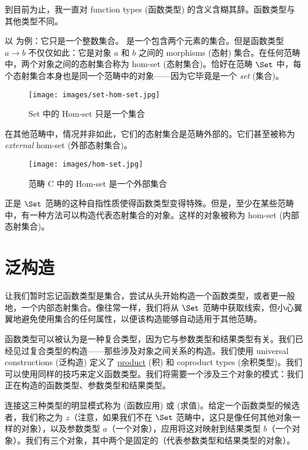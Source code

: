 
\lettrine[lhang=0.17]{到}{目前为止}，我一直对 function types (函数类型) 的含义含糊其辞。函数类型与其他类型不同。

以  为例：它只是一个整数集合。 是一个包含两个元素的集合。但是函数类型 $a\to b$ 不仅仅如此：它是对象 $a$ 和 $b$ 之间的 morphisms (态射) 集合。在任何范畴中，两个对象之间的态射集合称为 hom-set (态射集合)。恰好在范畴 $\Set$ 中，每个态射集合本身也是同一个范畴中的对象——因为它毕竟是一个 \emph{set} (集合)。

\begin{figure}[H]
  \centering
  \texttt{[image: images/set-hom-set.jpg]}
  \caption{Set 中的 Hom-set 只是一个集合}
\end{figure}

\noindent
在其他范畴中，情况并非如此，它们的态射集合是范畴外部的。它们甚至被称为 \emph{external} hom-set (外部态射集合)。

\begin{figure}[H]
  \centering
  \texttt{[image: images/hom-set.jpg]}
  \caption{范畴 C 中的 Hom-set 是一个外部集合}
\end{figure}

\noindent
正是 $\Set$ 范畴的这种自指性质使得函数类型变得特殊。但是，至少在某些范畴中，有一种方法可以构造代表态射集合的对象。这样的对象被称为  hom-set (内部态射集合)。

\section{泛构造}

让我们暂时忘记函数类型是集合，尝试从头开始构造一个函数类型，或者更一般地，一个内部态射集合。像往常一样，我们将从 $\Set$ 范畴中获取线索，但小心翼翼地避免使用集合的任何属性，以便该构造能够自动适用于其他范畴。

函数类型可以被认为是一种复合类型，因为它与参数类型和结果类型有关。我们已经见过复合类型的构造——那些涉及对象之间关系的构造。我们使用 universal constructions (泛构造) 定义了 \hyperref[products-and-coproducts]{product} (积) 和 coproduct types (余积类型)。我们可以使用同样的技巧来定义函数类型。我们将需要一个涉及三个对象的模式：我们正在构造的函数类型、参数类型和结果类型。

连接这三种类型的明显模式称为  (函数应用) 或  (求值)。给定一个函数类型的候选者，我们称之为 $z$（注意，如果我们不在 $\Set$ 范畴中，这只是像任何其他对象一样的对象），以及参数类型 $a$（一个对象），应用将这对映射到结果类型 $b$（一个对象）。我们有三个对象，其中两个是固定的（代表参数类型和结果类型的对象）。

